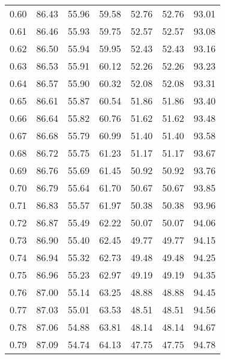 \begin{tabular}{|c|c|c|c|c|c|c|}
      0.60 &     86.43 &     55.96 &      59.58 &   52.76 &      52.76 &         93.01 \\
      0.61 &     86.46 &     55.93 &      59.75 &   52.57 &      52.57 &         93.08 \\
      0.62 &     86.50 &     55.94 &      59.95 &   52.43 &      52.43 &         93.16 \\
      0.63 &     86.53 &     55.91 &      60.12 &   52.26 &      52.26 &         93.23 \\
      0.64 &     86.57 &     55.90 &      60.32 &   52.08 &      52.08 &         93.31 \\
      0.65 &     86.61 &     55.87 &      60.54 &   51.86 &      51.86 &         93.40 \\
      0.66 &     86.64 &     55.82 &      60.76 &   51.62 &      51.62 &         93.48 \\
      0.67 &     86.68 &     55.79 &      60.99 &   51.40 &      51.40 &         93.58 \\
      0.68 &     86.72 &     55.75 &      61.23 &   51.17 &      51.17 &         93.67 \\
      0.69 &     86.76 &     55.69 &      61.45 &   50.92 &      50.92 &         93.76 \\
      0.70 &     86.79 &     55.64 &      61.70 &   50.67 &      50.67 &         93.85 \\
      0.71 &     86.83 &     55.57 &      61.97 &   50.38 &      50.38 &         93.96 \\
      0.72 &     86.87 &     55.49 &      62.22 &   50.07 &      50.07 &         94.06 \\
      0.73 &     86.90 &     55.40 &      62.45 &   49.77 &      49.77 &         94.15 \\
      0.74 &     86.94 &     55.32 &      62.73 &   49.48 &      49.48 &         94.25 \\
      0.75 &     86.96 &     55.23 &      62.97 &   49.19 &      49.19 &         94.35 \\
      0.76 &     87.00 &     55.14 &      63.25 &   48.88 &      48.88 &         94.45 \\
      0.77 &     87.03 &     55.01 &      63.53 &   48.51 &      48.51 &         94.56 \\
      0.78 &     87.06 &     54.88 &      63.81 &   48.14 &      48.14 &         94.67 \\
      0.79 &     87.09 &     54.74 &      64.13 &   47.75 &      47.75 &         94.78 \\

\end{tabular}
